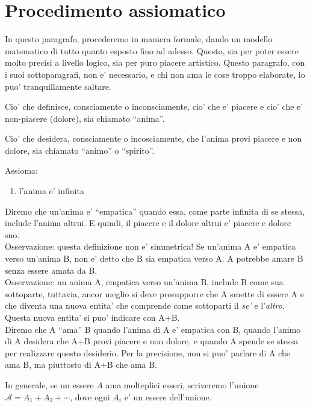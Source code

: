 \section{Procedimento assiomatico}
\label{procAx}

In questo paragrafo, procederemo in maniera formale, dando un modello matematico di tutto quanto esposto fino ad adesso. Questo, sia per poter essere molto precisi a livello logico, sia per puro piacere artistico. Questo paragrafo, con i suoi sottoparagrafi, non e' necessario, e chi non ama le cose troppo elaborate, lo puo' tranquillamente saltare.

Cio' che definisce, consciamente o inconsciamente, cio' che e' piacere e cio' che e' non-piacere (dolore), sia chiamato ``anima''.

Cio' che desidera, consciamente o incosciamente, che l'anima provi piacere e non dolore, sia chiamato ``animo'' o ``spirito''.

Assioma:
\begin{enumerate}
    \item l'anima e' infinita
\end{enumerate}

Diremo che un'anima e' ``empatica'' quando essa, come parte infinita di se stessa, include l'anima altrui. E quindi, il piacere e il dolore altrui e' piacere e dolore suo. \\
Osservazione: questa definizione non e' simmetrica! Se un'anima A e' empatica verso un'anima B, non e' detto che B sia empatica verso A. A potrebbe amare B senza essere amata da B. \\
Osservazione: un anima A, empatica verso un'anima B, include B come sua sottoparte, tuttavia, ancor meglio si deve presupporre che A smette di essere A e che diventa una nuova entita' che comprende come sottoparti il \emph{se'} e l'\emph{altro}. Questa nuova entita' si puo' indicare con A+B. \\

Diremo che A ``ama'' B quando l'anima di A e' empatica con B, quando l'animo di A desidera che A+B provi piacere e non dolore, e quando A spende se stessa per realizzare questo desiderio. Per la precisione, non si puo' parlare di A che ama B, ma piuttosto di A+B che ama B. 

In generale, se un essere $A$ ama molteplici esseri, scriveremo l'unione $\mathcal{A}=A_1+A_2+\cdots$, dove ogni $A_i$ e' un essere dell'unione.

\def\self{\textrm{self}}
\def\other{\textrm{other}}

